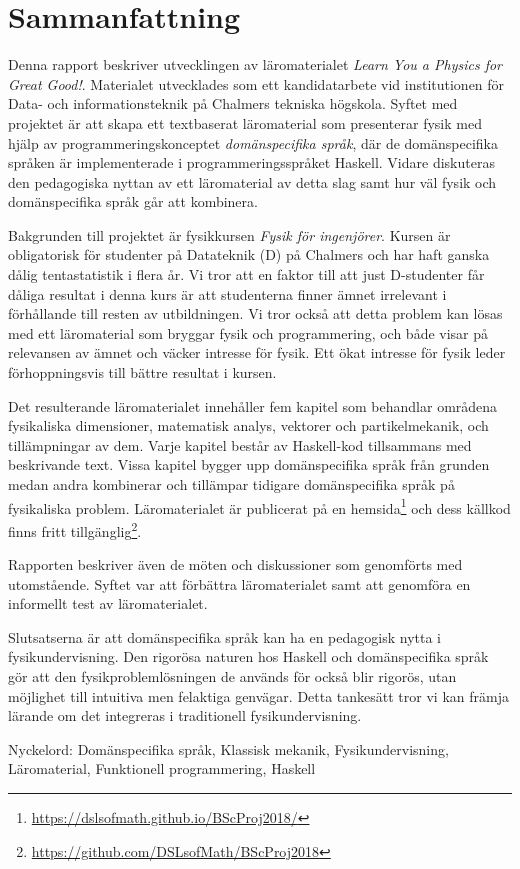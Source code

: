 
\thispagestyle{plain}			%

\section*{Sammanfattning}

Denna rapport beskriver utvecklingen av läromaterialet \textit{Learn You a
Physics for Great Good!}. Materialet utvecklades som ett kandidatarbete vid
institutionen för Data- och informationsteknik på Chalmers tekniska högskola.
Syftet med projektet är att skapa ett textbaserat läromaterial som presenterar
fysik med hjälp av programmeringskonceptet \textit{domänspecifika språk}, där de
domänspecifika språken är implementerade i programmeringsspråket Haskell. Vidare
diskuteras den pedagogiska nyttan av ett läromaterial av detta slag samt hur
väl fysik och domänspecifika språk går att kombinera.

Bakgrunden till projektet är fysikkursen \textit{Fysik för ingenjörer}. Kursen
är obligatorisk för studenter på Datateknik (D) på Chalmers och har haft ganska
dålig tentastatistik i flera år. Vi tror att en faktor till att just D-studenter
får dåliga resultat i denna
kurs är att studenterna finner ämnet irrelevant i förhållande till
resten av utbildningen. Vi tror också att detta problem kan lösas med ett
läromaterial som bryggar fysik och
programmering, och både visar på relevansen av ämnet och väcker
intresse för fysik. Ett ökat intresse för fysik leder förhoppningsvis
till bättre resultat i kursen.

Det resulterande läromaterialet innehåller fem kapitel som
behandlar områdena fysikaliska dimensioner, matematisk analys,
vektorer och partikelmekanik, och tillämpningar av dem. Varje kapitel
består av Haskell-kod tillsammans med beskrivande
text. Vissa kapitel bygger upp domänspecifika språk från grunden medan
andra kombinerar och tillämpar tidigare domänspecifika språk på
fysikaliska problem. Läromaterialet är publicerat på en
hemsida\footnote{\url{https://dslsofmath.github.io/BScProj2018/}} och dess
källkod finns fritt
tillgänglig\footnote{\url{https://github.com/DSLsofMath/BScProj2018}}.

Rapporten beskriver
även de möten och diskussioner som genomförts med utomstående. Syftet var att
förbättra läromaterialet samt att genomföra en informellt test av
läromaterialet.

Slutsatserna är att
domänspecifika språk kan ha en pedagogisk nytta i
fysikundervisning. Den
rigorösa naturen hos Haskell och domänspecifika språk gör att
den fysikproblemlösningen de används för också blir
rigorös, utan möjlighet till intuitiva men felaktiga
genvägar. Detta tankesätt tror vi kan främja lärande om det integreras i
traditionell fysikundervisning.

\vfill
Nyckelord: Domänspecifika språk, Klassisk mekanik, Fysikundervisning, Läromaterial, Funktionell programmering, Haskell

\newpage				%
\thispagestyle{empty}
\mbox{}
